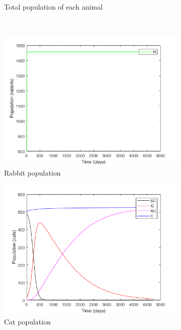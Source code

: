 \documentclass[12pt]{article}
\begin{document}
\begin{figure}[!ht]
\begin{subfigure}{0.45\textwidth}
        \caption{Total population of each animal}
    \end{subfigure}\\
    \begin{subfigure}{0.45\textwidth}
        \centering
        \includegraphics[width=\textwidth]{images/main_R.png}
        \caption{Rabbit population}
    \end{subfigure}
    \begin{subfigure}{0.45\textwidth}
        \centering
        \includegraphics[width=\textwidth]{images/main_C.png}
        \caption{Cat population}
    \end{subfigure}\\
    \begin{subfigure}{0.45\textwidth}

\end{subfigure}
\end{figure}
\end{document}
